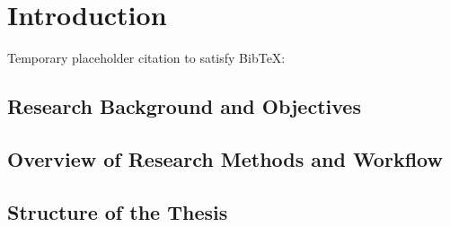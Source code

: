 \chapter{Introduction}
Temporary placeholder citation to satisfy BibTeX: \cite{dummy2024}
\section{Research Background and Objectives}

\section{Overview of Research Methods and Workflow}

\section{Structure of the Thesis}

